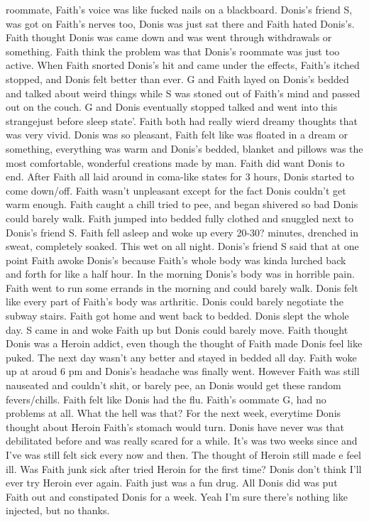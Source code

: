 \documentclass[12pt]{book}
\begin{document}
roommate, Faith's voice was like fucked nails on a blackboard. Donis's friend S, was got on Faith's nerves too, Donis was just sat there and Faith hated Donis's. Faith thought Donis was came down and was went through withdrawals or something. Faith think the problem was that Donis's roommate was just too active. When Faith snorted Donis's hit and came under the effects, Faith's itched stopped, and Donis felt better than ever. G and Faith layed on Donis's bedded and talked about weird things while S was stoned out of Faith's mind and passed out on the couch. G and Donis eventually stopped talked and went into this strangejust before sleep state'. Faith both had really wierd dreamy thoughts that was very vivid. Donis was so pleasant, Faith felt like was floated in a dream or something, everything was warm and Donis's bedded, blanket and pillows was the most comfortable, wonderful creations made by man. Faith did want Donis to end. After Faith all laid around in coma-like states for 3 hours, Donis started to come down/off. Faith wasn't unpleasant except for the fact Donis couldn't get warm enough. Faith caught a chill tried to pee, and began shivered so bad Donis could barely walk. Faith jumped into bedded fully clothed and snuggled next to Donis's friend S. Faith fell asleep and woke up every 20-30? minutes, drenched in sweat, completely soaked. This wet on all night. Donis's friend S said that at one point Faith awoke Donis's because Faith's whole body was kinda lurched back and forth for like a half hour. In the morning Donis's body was in horrible pain. Faith went to run some errands in the morning and could barely walk. Donis felt like every part of Faith's body was arthritic. Donis could barely negotiate the subway stairs. Faith got home and went back to bedded. Donis slept the whole day. S came in and woke Faith up but Donis could barely move. Faith thought Donis was a Heroin addict, even though the thought of Faith made Donis feel like puked. The next day wasn't any better and stayed in bedded all day. Faith woke up at aroud 6 pm and Donis's headache was finally went. However Faith was still nauseated and couldn't shit, or barely pee, an Donis would get these random fevers/chills. Faith felt like Donis had the flu. Faith's oommate G, had no problems at all. What the hell was that? For the next week, everytime Donis thought about Heroin Faith's stomach would turn. Donis have never was that debilitated before and was really scared for a while. It's was two weeks since and I've was still felt sick every now and then. The thought of Heroin still made e feel ill. Was Faith junk sick after tried Heroin for the first time? Donis don't think I'll ever try Heroin ever again. Faith just was a fun drug. All Donis did was put Faith out and constipated Donis for a week. Yeah I'm sure there's nothing like injected, but no thanks.
\end{document}
